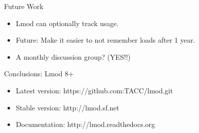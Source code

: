 \documentclass{beamer}
\begin{document}
\begin{frame}{Future Work}
  \begin{itemize}
    \item Lmod can optionally track usage.
    \item Future: Make it easier to not remember loads after 1 year.
    \item A monthly discussion group? (YES!!)
  \end{itemize}
\end{frame}

\begin{frame}{Conclusions: Lmod 8+}
  \begin{itemize}
    \item Latest version: https://github.com:TACC/lmod.git
    \item Stable version: http://lmod.sf.net
    \item Documentation:  http://lmod.readthedocs.org
  \end{itemize}
\end{frame}
\end{document}
